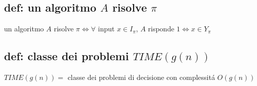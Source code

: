 \subsection*{def: un algoritmo $A$ risolve $\pi$}
\begin{flushleft}
	un algoritmo $A$ risolve $\pi\iff\forall$ input $x\in I_{\pi}$, $A$ risponde $1\iff x\in Y_{\pi}$
\end{flushleft}


\subsection*{def: classe dei problemi $TIME(g(n))$}
\begin{flushleft}
	$TIME(g(n))=$ classe dei problemi di decisione con complessit\'a $O(g(n))$
\end{flushleft}


\newpage
